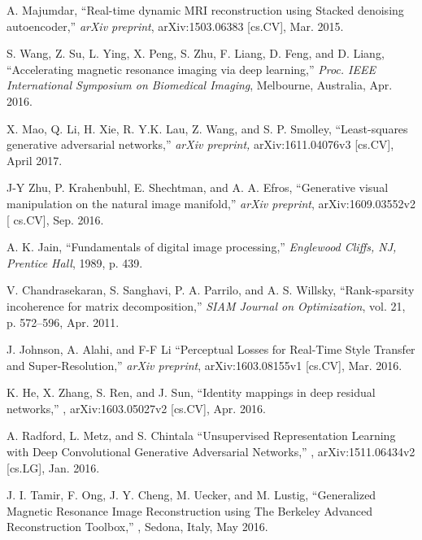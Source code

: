 \documentclass{journal}
\begin{document}
\begin{thebibliography}{10}
		
		 A. Majumdar,
		\newblock ``Real-time dynamic MRI reconstruction using Stacked denoising autoencoder,''
		\newblock \emph{arXiv preprint}, arXiv:1503.06383 [cs.CV], Mar. 2015.
		
		
		 S. Wang, Z. Su, L. Ying, X. Peng, S. Zhu, F. Liang, D. Feng, and D. Liang,
		\newblock ``Accelerating magnetic resonance imaging via deep learning,''
		\newblock \emph{Proc. IEEE International Symposium on Biomedical Imaging}, Melbourne, Australia, Apr. 2016.
		
		
		 X. Mao, Q. Li, H. Xie, R. Y.K. Lau, Z. Wang, and S. P. Smolley, 
		\newblock ``Least-squares generative adversarial networks,'' 
		\newblock \emph{arXiv preprint,} arXiv:1611.04076v3 [cs.CV], April 2017.
		
		
		 J-Y Zhu, P. Krahenbuhl, E. Shechtman, and A. A. Efros,
		\newblock ``Generative visual manipulation on the natural image manifold,''
		\newblock \emph{arXiv preprint}, arXiv:1609.03552v2 [
		cs.CV], Sep. 2016.
		
		
		
		 A. K. Jain,
		\newblock ``Fundamentals of digital image processing,''
		\newblock \emph{Englewood Cliffs, NJ, Prentice Hall}, 1989, p. 439.
		
		
		 V. Chandrasekaran, S. Sanghavi, P. A. Parrilo, and A. S. Willsky,
		\newblock ``Rank-sparsity incoherence for matrix decomposition,''
		\newblock \emph{SIAM Journal on Optimization}, vol. 21, p. 572--596, Apr. 2011.
		
		
		 J. Johnson, A. Alahi, and F-F Li
		\newblock ``Perceptual Losses for Real-Time Style Transfer and Super-Resolution,''
		\newblock \emph{arXiv preprint}, arXiv:1603.08155v1 [cs.CV], Mar. 2016.
		
		
		 K. He, X. Zhang, S. Ren, and J. Sun,
		\newblock ``Identity mappings in deep residual networks,''
		, arXiv:1603.05027v2 [cs.CV], Apr. 2016.
		
		
		
		 A. Radford, L. Metz, and S. Chintala
		\newblock ``Unsupervised Representation Learning with Deep Convolutional Generative Adversarial Networks,''
		, arXiv:1511.06434v2 [cs.LG], Jan. 2016.
		
		
		 J. I. Tamir, F. Ong, J. Y. Cheng, M. Uecker, and M. Lustig,
		\newblock ``Generalized Magnetic Resonance Image Reconstruction using The Berkeley Advanced Reconstruction Toolbox,''
		, Sedona, Italy, May 2016.
		

\end{thebibliography}
\end{document}
